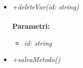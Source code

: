 \begin{itemize}
\begin{itemize}
\begin{itemize}
    		\end{itemize}
    		\item \emph{+deleteVar(id: string)}\\
    		\\
    		\textbf{Parametri:}
    		\begin{itemize}
    			\item \emph{id: string}\\
    			
    		\end{itemize}
    		\item \emph{+salvaMetodo()}\\
    		
		\end{itemize}
\end{itemize}